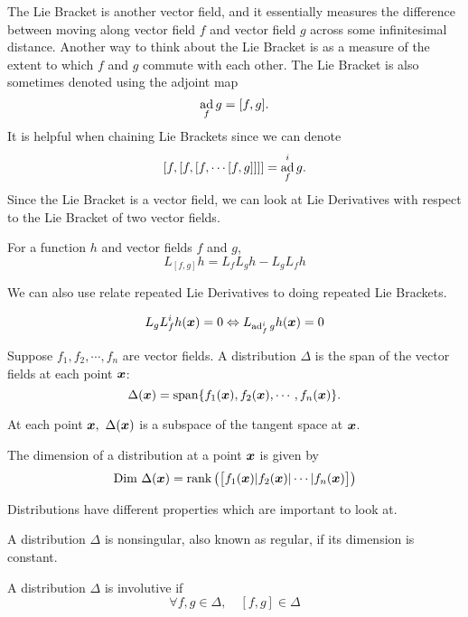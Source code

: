 The Lie Bracket is another vector field, and it essentially measures the
difference between moving along vector field $f$ and vector field $g$ across
some infinitesimal distance. Another way to think about the Lie Bracket is as a
measure of the extent to which $f$ and $g$ commute with each other. The Lie
Bracket is also sometimes denoted using the adjoint map \[
	\operatorname*{ad}_fg = [f, g].
\]
It is helpful when chaining Lie Brackets since we can denote \[
	[f,[f,[f,\cdots[f,g]]]] = \operatorname*{ad}_f^ig.
\]
Since the Lie Bracket is a vector field, we can look at Lie Derivatives with
respect to the Lie Bracket of two vector fields.
\begin{theorem}
	For a function $h$ and vector fields $f$ and $g$, \[
		L_{[f,g]}h = L_fL_gh - L_gL_fh
	\]
	\label{thm:lie-brack-derivative}
\end{theorem}
We can also use relate repeated Lie Derivatives to doing repeated Lie Brackets.
\begin{theorem}
	\[
		L_gL_f^ih(\boldsymbol{x}) = 0 \Leftrightarrow L_{\operatorname*{ad}_f^ig}h(\boldsymbol{x}) = 0
	\]
	\label{thm:repeated-lie}
\end{theorem}
\begin{definition}
	Suppose $f_1,f_2,\cdots,f_n$ are vector fields. A distribution $\Delta$ is the
	span of the vector fields at each point $\boldsymbol{x}$: \[
		\Delta(\boldsymbol{x}) = \text{span}\{f_1(\boldsymbol{x}), f_2(\boldsymbol{x}),\cdots,f_n(\boldsymbol{x})\}.
	\]
	\label{defn:distribution}
\end{definition}
At each point $\bs{x},\ \Delta(\bs{x})$ is a subspace of the tangent space at
$\boldsymbol{x}$.
\begin{definition}
	The dimension of a distribution at a point $\boldsymbol{x}$ is given by \[
		\text{Dim }\Delta(\boldsymbol{x}) = \text{rank}\left(\begin{bmatrix}
				f_1(\boldsymbol{x}) | f_2(\boldsymbol{x}) | \cdots | f_n(\boldsymbol{x})
		\end{bmatrix}\right)
	\]
	\label{defn:distribution-dimension}
\end{definition}
Distributions have different properties which are important to look at.
\begin{definition}
	A distribution $\Delta$ is nonsingular, also known as regular, if its
	dimension is constant.
	\label{defn:regular-dimension}
\end{definition}
\begin{definition}
	A distribution $\Delta$ is involutive if \[
		\forall f, g\in \Delta, \quad [f, g] \in \Delta
	\]
	\label{defn:involutive-distribution}
\end{definition}
